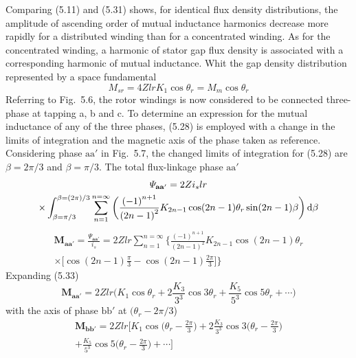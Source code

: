 \documentclass[a4paper,numbers=noenddot,12pt]{scrbook}
\begin{document}
        Comparing (5.11) and (5.31) shows, for identical flux density distributions, the amplitude of ascending order of mutual inductance harmonics decrease more rapidly for a distributed winding than for a concentrated winding. As for the concentrated winding, a harmonic of stator gap flux density is associated with a corresponding harmonic of mutual inductance. Whit the gap density distribution represented by a space fundamental
        \begin{equation}
            M_{sr} = 4Z l r K_1 \cos \theta_r = M_m \cos \theta_r
        \end{equation}
        Referring to Fig.\ 5.6, the rotor windings is now considered to be connected three-phase at tapping a, b and c. To determine an expression for the mutual inductance of any of the three phases, (5.28) is employed with a change in the limits of integration and the magnetic axis of the phase taken as reference. Considering phase $\textrm{aa}'$ in Fig.\ 5.7, the changed limits of integration for (5.28) are $\beta = 2\pi / 3$ and $\beta = \pi / 3$. The total flux-linkage phase $\textrm{aa}'$
        \begin{multline*}
            \mathbf{\varPsi_{aa'}} = 2 Z i_s l r \\
            \times \int_{\beta = \pi / 3}^{\beta = (2 \pi)/3} \displaystyle \sum_{n = 1}^{n = \infty} \bigg( \frac{{(-1)}^{n+1}}{{(2n - 1)}^2}K_{2n-1} \cos(2n - 1) \theta_r \sin(2n - 1) \beta \bigg) \dif \beta \\
        \end{multline*}
        \begin{multline}
            \mathbf{M_{aa'}} = \frac{\mathbf{\varPsi_{aa'}}}{i_s} = 2 Z l r \displaystyle \sum_{n = 1}^{n = \infty}  \bigg \{\frac{{(-1)}^{n+1}}{{(2n -1)}^2} K_{2n - 1} \cos(2n - 1) \theta_r  \\
            \times \bigg[ \cos(2n - 1) \frac{\pi}{3}  - \cos(2n -1) \frac{2\pi}{3} \bigg] \bigg \}
        \end{multline}
        Expanding (5.33)
        \begin{equation*}
            \mathbf{M_{aa'}} = 2 Z l r \bigg( K_1 \cos \theta_r + 2 \frac{K_3}{3^3} \cos 3 \theta_r + \frac{K_5}{5^3} \cos 5 \theta_r + \cdots \bigg)
        \end{equation*}
        with the axis of phase $\textrm{bb}'$ at $(\theta_r - 2\pi/3$)
        \begin{multline} %
            \boldsymbol{M_\mathbf{bb'}} = 2 Z l r \bigg[ K_1 \cos \bigg(\theta_r - \frac{2 \pi}{3} \bigg) + 2 \frac{K_3}{3^3} \cos 3 \bigg(\theta_r - \frac{2 \pi}{3} \bigg) \\
            + \frac{K_5}{5^3} \cos 5 \bigg( \theta_r - \frac{2 \pi}{3} \bigg ) + \cdots \bigg]
        \end{multline}
\end{document}
